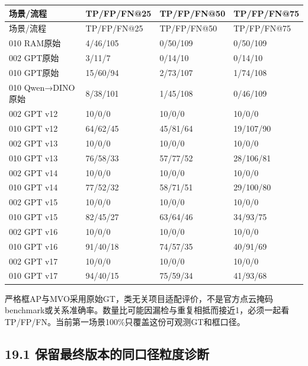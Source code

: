 \documentclass[UTF8,fontset=fandol]{ctexart}
\begin{document}
{\small
\begin{longtable}{|p{}|p{}|p{}|p{}|}
\hline
场景/流程 & TP/FP/FN@25 & TP/FP/FN@50 & TP/FP/FN@75 \\ \hline
\endfirsthead
\hline
场景/流程 & TP/FP/FN@25 & TP/FP/FN@50 & TP/FP/FN@75 \\ \hline
\endhead
010 RAM原始 & 4/46/105 & 0/50/109 & 0/50/109 \\ \hline
002 GPT原始 & 3/11/7 & 0/14/10 & 0/14/10 \\ \hline
010 GPT原始 & 15/60/94 & 2/73/107 & 1/74/108 \\ \hline
010 Qwen→DINO原始 & 8/38/101 & 1/45/108 & 0/46/109 \\ \hline
002 GPT v12 & 10/0/0 & 10/0/0 & 10/0/0 \\ \hline
010 GPT v12 & 64/62/45 & 45/81/64 & 19/107/90 \\ \hline
002 GPT v13 & 10/0/0 & 10/0/0 & 10/0/0 \\ \hline
010 GPT v13 & 76/58/33 & 57/77/52 & 28/106/81 \\ \hline
002 GPT v14 & 10/0/0 & 10/0/0 & 10/0/0 \\ \hline
010 GPT v14 & 77/52/32 & 58/71/51 & 29/100/80 \\ \hline
002 GPT v15 & 10/0/0 & 10/0/0 & 10/0/0 \\ \hline
010 GPT v15 & 82/45/27 & 63/64/46 & 34/93/75 \\ \hline
002 GPT v16 & 10/0/0 & 10/0/0 & 10/0/0 \\ \hline
010 GPT v16 & 91/40/18 & 74/57/35 & 40/91/69 \\ \hline
002 GPT v17 & 10/0/0 & 10/0/0 & 10/0/0 \\ \hline
010 GPT v17 & 94/40/15 & 75/59/34 & 41/93/68 \\ \hline
\end{longtable}
}

严格框AP与MVO采用原始GT，类无关项目适配评价，不是官方点云掩码benchmark或关系准确率。数量比可能因漏检与重复相抵而接近1，必须一起看TP/FP/FN。当前第一场景100\%只覆盖这份可观测GT和框口径。



\subsection*{19.1 保留最终版本的同口径粒度诊断}
\end{document}
